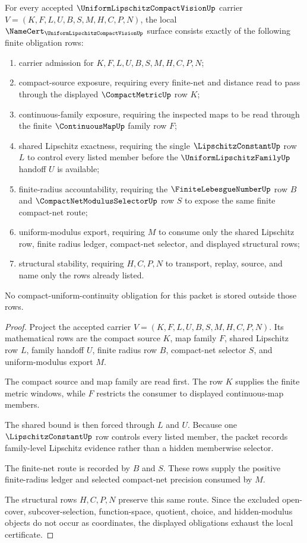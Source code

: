 \begin{theorem}
\label{thm:uniform-lipschitz-family-compact-vision-namecert-obligations}
For every accepted $\UniformLipschitzCompactVisionUp$ carrier $V=(K,F,L,U,B,S,M,H,C,P,N)$, the local $\NameCert_{\UniformLipschitzCompactVisionUp}$ surface consists exactly of the following finite obligation rows:
\begin{enumerate}
\item carrier admission for $K,F,L,U,B,S,M,H,C,P,N$;
\item compact-source exposure, requiring every finite-net and distance read to pass through the displayed $\CompactMetricUp$ row $K$;
\item continuous-family exposure, requiring the inspected maps to be read through the finite $\ContinuousMapUp$ family row $F$;
\item shared Lipschitz exactness, requiring the single $\LipschitzConstantUp$ row $L$ to control every listed member before the $\UniformLipschitzFamilyUp$ handoff $U$ is available;
\item finite-radius accountability, requiring the $\FiniteLebesgueNumberUp$ row $B$ and $\CompactNetModulusSelectorUp$ row $S$ to expose the same finite compact-net route;
\item uniform-modulus export, requiring $M$ to consume only the shared Lipschitz row, finite radius ledger, compact-net selector, and displayed structural rows;
\item structural stability, requiring $H,C,P,N$ to transport, replay, source, and name only the rows already listed.
\end{enumerate}
No compact-uniform-continuity obligation for this packet is stored outside those rows.
\end{theorem}
\begin{proof}
Project the accepted carrier $V=(K,F,L,U,B,S,M,H,C,P,N)$. Its mathematical rows are the compact source $K$, map family $F$, shared Lipschitz row $L$, family handoff $U$, finite radius row $B$, compact-net selector $S$, and uniform-modulus export $M$.

The compact source and map family are read first. The row $K$ supplies the finite metric windows, while $F$ restricts the consumer to displayed continuous-map members.

The shared bound is then forced through $L$ and $U$. Because one $\LipschitzConstantUp$ row controls every listed member, the packet records family-level Lipschitz evidence rather than a hidden memberwise selector.

The finite-net route is recorded by $B$ and $S$. These rows supply the positive finite-radius ledger and selected compact-net precision consumed by $M$.

The structural rows $H,C,P,N$ preserve this same route. Since the excluded open-cover, subcover-selection, function-space, quotient, choice, and hidden-modulus objects do not occur as coordinates, the displayed obligations exhaust the local certificate.
\end{proof}

